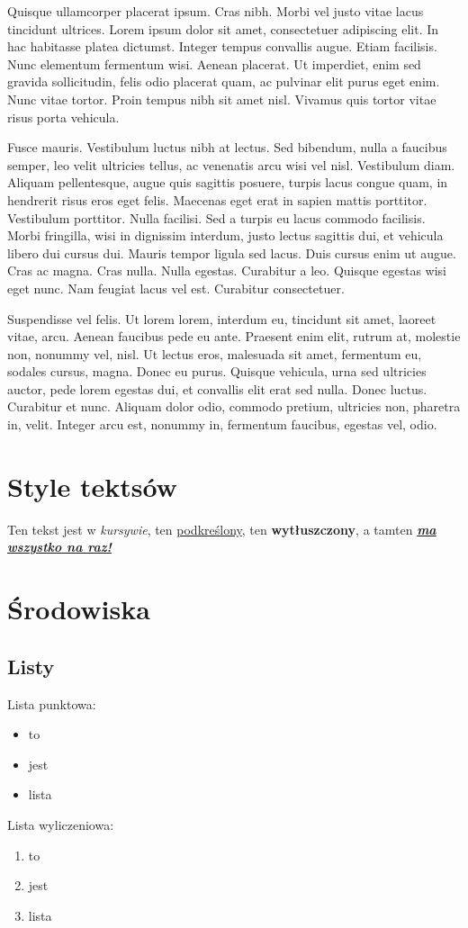 \documentclass{article}
\begin{document}
Quisque ullamcorper placerat ipsum. Cras nibh. Morbi vel justo vitae lacus
tincidunt ultrices. Lorem ipsum dolor sit amet, consectetuer adipiscing elit. In
hac habitasse platea dictumst. Integer tempus convallis augue. Etiam facilisis.
Nunc elementum fermentum wisi. Aenean placerat. Ut imperdiet, enim sed
gravida sollicitudin, felis odio placerat quam, ac pulvinar elit purus eget enim.
Nunc vitae tortor. Proin tempus nibh sit amet nisl. Vivamus quis tortor vitae
risus porta vehicula.

Fusce mauris. Vestibulum luctus nibh at lectus. Sed bibendum, nulla a faucibus semper, leo velit ultricies tellus, ac venenatis arcu wisi vel nisl. Vestibulum
diam. Aliquam pellentesque, augue quis sagittis posuere, turpis lacus congue
quam, in hendrerit risus eros eget felis. Maecenas eget erat in sapien mattis
porttitor. Vestibulum porttitor. Nulla facilisi. Sed a turpis eu lacus commodo
facilisis. Morbi fringilla, wisi in dignissim interdum, justo lectus sagittis dui, et
vehicula libero dui cursus dui. Mauris tempor ligula sed lacus. Duis cursus enim
ut augue. Cras ac magna. Cras nulla. Nulla egestas. Curabitur a leo. Quisque
egestas wisi eget nunc. Nam feugiat lacus vel est. Curabitur consectetuer.

Suspendisse vel felis. Ut lorem lorem, interdum eu, tincidunt sit amet, laoreet vitae, arcu. Aenean faucibus pede eu ante. Praesent enim elit, rutrum at,
molestie non, nonummy vel, nisl. Ut lectus eros, malesuada sit amet, fermentum
eu, sodales cursus, magna. Donec eu purus. Quisque vehicula, urna sed ultricies
auctor, pede lorem egestas dui, et convallis elit erat sed nulla. Donec luctus.
Curabitur et nunc. Aliquam dolor odio, commodo pretium, ultricies non, pharetra in, velit. Integer arcu est, nonummy in, fermentum faucibus, egestas vel,
odio.

\section{Style tektsów}
Ten tekst jest w \textit{kursywie}, ten \underline{podkreślony}, ten \textbf{wytłuszczony}, \newline
a tamten \textbf{\textit{\underline{ma wszystko na raz!}}} 

\section{Środowiska}

\subsection{Listy}
Lista punktowa:
\begin{itemize}
    \item to
    \item jest
    \item lista
\end{itemize}
Lista wyliczeniowa:
\begin{enumerate}
    \item to
    \item jest
    \item lista
\end{enumerate}
\newpage
\end{document}
